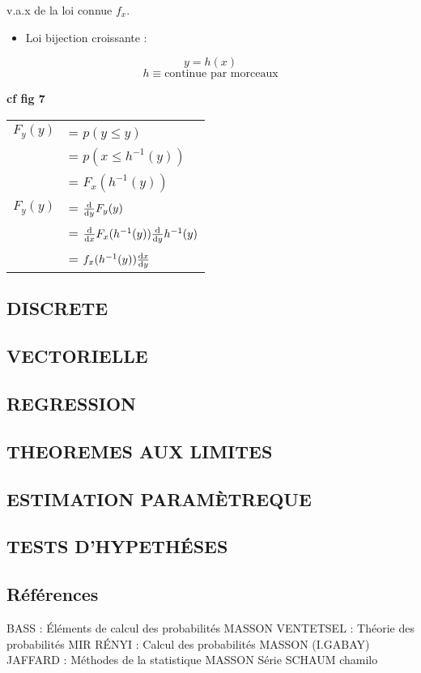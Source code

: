 \documentclass[]{article}
\begin{document}
v.a.x de la loi connue $f_x$.

\begin{itemize}
\itemsep1pt\parskip0pt
\item
  Loi bijection croissante :
\end{itemize}

\[y = h(x)\] \[h \equiv \text{continue par morceaux}\]

\textbf{cf fig 7}

\begin{tabular}{r l}
$F_y(y)$ &= $p(y \leq y)$ \\
&= $p(x \leq h^{-1}(y))$ \\
&= $F_x(h^{-1}(y))$ \\
$F_y(y)$ &= $\frac{\mathrm{d} }{\mathrm{d}y} F_y(y)$ \\
&= $\frac{\mathrm{d} }{\mathrm{d}x} F_x(h^{-1}(y)) \frac{\mathrm{d} }{\mathrm{d}y}h^{-1}(y)$ \\
&= $f_x(h^{-1}(y))\frac{\mathrm{d} x}{\mathrm{d}y}$ \\
\end{tabular}

\subsection{DISCRETE}

\subsection{VECTORIELLE}

\subsection{REGRESSION}

\subsection{THEOREMES AUX LIMITES}

\subsection{ESTIMATION PARAMÈTREQUE}

\subsection{TESTS D'HYPETHÉSES}

\subsection{Références}

BASS : Éléments de calcul des probabilités MASSON VENTETSEL : Théorie
des probabilités MIR RÉNYI : Calcul des probabilités MASSON (I.GABAY)
JAFFARD : Méthodes de la statistique MASSON Série SCHAUM chamilo
\end{document}
